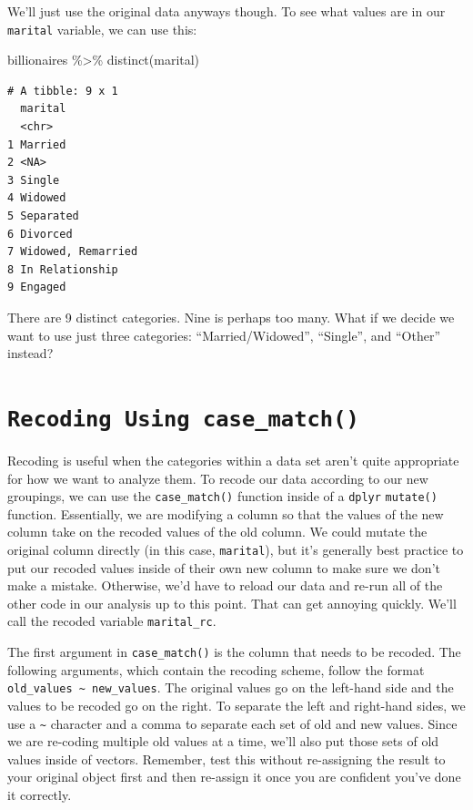 \documentclass[
  letterpaper,
]{book}
\newenvironment{Shaded}{\begin{snugshade}}{\end{snugshade}}
\newcommand{\FunctionTok}[1]{\textcolor[rgb]{0.28,0.35,0.67}{#1}}
\newcommand{\NormalTok}[1]{\textcolor[rgb]{0.00,0.23,0.31}{#1}}
\newcommand{\SpecialCharTok}[1]{\textcolor[rgb]{0.37,0.37,0.37}{#1}}
\begin{document}
We'll just use the original data anyways though. To see what values are
in our \texttt{marital} variable, we can use this:

\begin{Shaded}
\begin{Highlighting}[]
\NormalTok{billionaires }\SpecialCharTok{\%\textgreater{}\%}
  \FunctionTok{distinct}\NormalTok{(marital)}
\end{Highlighting}
\end{Shaded}

\begin{verbatim}
# A tibble: 9 x 1
  marital           
  <chr>             
1 Married           
2 <NA>              
3 Single            
4 Widowed           
5 Separated         
6 Divorced          
7 Widowed, Remarried
8 In Relationship   
9 Engaged           
\end{verbatim}

There are 9 distinct categories. Nine is perhaps too many. What if we
decide we want to use just three categories: ``Married/Widowed'',
``Single'', and ``Other'' instead?

\hypertarget{recoding-using-case_match}{%
\section{\texorpdfstring{\texttt{Recoding\ Using\ case\_match()}}{Recoding Using case\_match()}}\label{recoding-using-case_match}}

Recoding is useful when the categories within a data set aren't quite
appropriate for how we want to analyze them. To recode our data
according to our new groupings, we can use the \texttt{case\_match()}
function inside of a \texttt{dplyr} \texttt{mutate()} function.
Essentially, we are modifying a column so that the values of the new
column take on the recoded values of the old column. We could mutate the
original column directly (in this case, \texttt{marital}), but it's
generally best practice to put our recoded values inside of their own
new column to make sure we don't make a mistake. Otherwise, we'd have to
reload our data and re-run all of the other code in our analysis up to
this point. That can get annoying quickly. We'll call the recoded
variable \texttt{marital\_rc}.

The first argument in \texttt{case\_match()} is the column that needs to
be recoded. The following arguments, which contain the recoding scheme,
follow the format \texttt{old\_values\ \textasciitilde{}\ new\_values}.
The original values go on the left-hand side and the values to be
recoded go on the right. To separate the left and right-hand sides, we
use a \texttt{\textasciitilde{}} character and a comma to separate each
set of old and new values. Since we are re-coding multiple old values at
a time, we'll also put those sets of old values inside of vectors.
Remember, test this without re-assigning the result to your original
object first and then re-assign it once you are confident you've done it
correctly.
\end{document}
